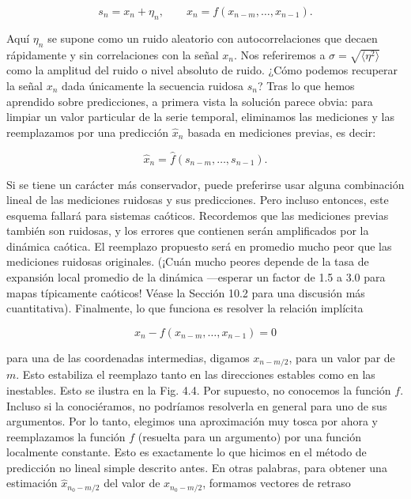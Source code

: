 \documentclass[10pt,a4paper]{book}
\begin{document}
\begin{equation}
s_n = x_n + \eta_n, \qquad x_n = f(x_{n-m}, \ldots, x_{n-1}) .
\end{equation}

Aquí $\eta_n$ se supone como un ruido aleatorio con autocorrelaciones que decaen rápidamente y sin correlaciones con la señal $x_n$. Nos referiremos a $\sigma = \sqrt{\langle \eta^2 \rangle}$ como la amplitud del ruido o nivel absoluto de ruido. ¿Cómo podemos recuperar la señal $x_n$ dada únicamente la secuencia ruidosa $s_n$? Tras lo que hemos aprendido sobre predicciones, a primera vista la solución parece obvia: para limpiar un valor particular de la serie temporal, eliminamos las mediciones y las reemplazamos por una predicción $\hat{x}_n$ basada en mediciones previas, es decir:  

\begin{equation}
\hat{x}_n = \hat{f}(s_{n-m}, \ldots, s_{n-1}) .
\end{equation}

Si se tiene un carácter más conservador, puede preferirse usar alguna combinación lineal de las mediciones ruidosas y sus predicciones. Pero incluso entonces, este esquema fallará para sistemas caóticos. Recordemos que las mediciones previas también son ruidosas, y los errores que contienen serán amplificados por la dinámica caótica. El reemplazo propuesto será en promedio mucho peor que las mediciones ruidosas originales. (¡Cuán mucho peores depende de la tasa de expansión local promedio de la dinámica —esperar un factor de 1.5 a 3.0 para mapas típicamente caóticos! Véase la Sección 10.2 para una discusión más cuantitativa). Finalmente, lo que funciona es resolver la relación implícita 

\begin{equation}
x_n - f(x_{n-m}, \ldots, x_{n-1}) = 0
\end{equation}

para una de las coordenadas intermedias, digamos $x_{n-m/2}$, para un valor par de $m$. Esto estabiliza el reemplazo tanto en las direcciones estables como en las inestables. Esto se ilustra en la Fig. 4.4. Por supuesto, no conocemos la función $f$. Incluso si la conociéramos, no podríamos resolverla en general para uno de sus argumentos. Por lo tanto, elegimos una aproximación muy tosca por ahora y reemplazamos la función $f$ (resuelta para un argumento) por una función localmente constante. Esto es exactamente lo que hicimos en el método de predicción no lineal simple descrito antes. En otras palabras, para obtener una estimación $\hat{x}_{n_0-m/2}$ del valor de $x_{n_0-m/2}$, formamos vectores de retraso 
\end{document}
